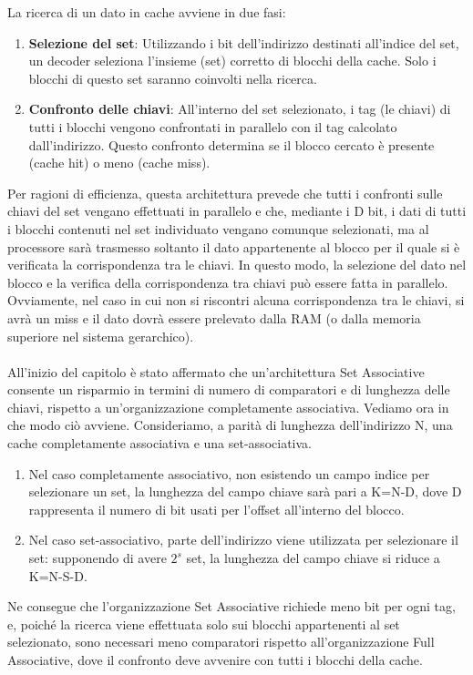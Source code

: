La ricerca di un dato in cache avviene in due fasi: 
\begin{enumerate}
    \item \textbf{Selezione del set}: Utilizzando i bit dell'indirizzo destinati all'indice del set, un decoder seleziona l’insieme (set) corretto di blocchi della cache. Solo i blocchi di questo set saranno coinvolti nella ricerca. 
    \item \textbf{Confronto delle chiavi}: All'interno del set selezionato, i tag (le chiavi) di tutti i blocchi vengono confrontati in parallelo con il tag calcolato dall’indirizzo. Questo confronto determina se il blocco cercato è presente (cache hit) o meno (cache miss).
\end{enumerate}
Per ragioni di efficienza, questa architettura prevede che tutti i confronti sulle chiavi del set vengano effettuati in parallelo e che, mediante i D bit, i dati di tutti i blocchi contenuti nel set individuato vengano comunque selezionati, ma al processore sarà trasmesso soltanto il dato appartenente al blocco per il quale si è verificata la corrispondenza tra le chiavi. In questo modo, la selezione del dato nel blocco e la verifica della corrispondenza tra chiavi può essere fatta in parallelo. Ovviamente, nel caso in cui non si riscontri alcuna corrispondenza tra le chiavi, si avrà un miss e il dato dovrà essere prelevato dalla RAM (o dalla memoria superiore nel sistema gerarchico).
\\
\\
All'inizio del capitolo è stato affermato che un'architettura Set Associative consente un risparmio in termini di numero di comparatori e di lunghezza delle chiavi, rispetto a un'organizzazione completamente associativa. Vediamo ora in che modo ciò avviene. Consideriamo, a parità di lunghezza dell'indirizzo N, una cache completamente associativa e una set-associativa. 
\begin{enumerate}
    \item Nel caso completamente associativo, non esistendo un campo indice per selezionare un set, la lunghezza del campo chiave sarà pari a K=N-D, dove D rappresenta il numero di bit usati per l'offset all'interno del blocco.
    \item Nel caso set-associativo, parte dell'indirizzo viene utilizzata per selezionare il set: supponendo di avere \(2^s\) set, la lunghezza del campo chiave si riduce a K=N-S-D.
\end{enumerate}
Ne consegue che l'organizzazione Set Associative richiede meno bit per ogni tag, e, poiché la ricerca viene effettuata solo sui blocchi appartenenti al set selezionato, sono necessari meno comparatori rispetto all'organizzazione Full Associative, dove il confronto deve avvenire con tutti i blocchi della cache.

